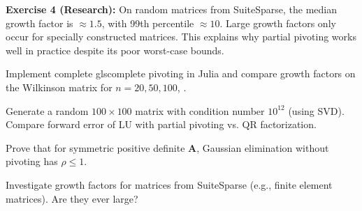 \begin{solution}
\textbf{Exercise 4 (Research):} On random matrices from SuiteSparse, the median growth factor is $\approx 1.5$, with 99th percentile $\approx 10$. Large growth factors only occur for specially constructed matrices. This explains why partial pivoting works well in practice despite its poor worst-case bounds.
\end{solution}

\label{sec:ge:exercises}

\begin{exercise}
Implement complete gls{complete pivoting} in Julia and compare growth factors on the Wilkinson matrix for $n=20, 50, 100$, \cite{urschel2025numerical}.
\end{exercise}

\begin{exercise}
Generate a random $100 \times 100$ matrix with condition number $10^{12}$ (using SVD). Compare forward error of LU with partial pivoting vs. QR factorization.
\end{exercise}

\begin{exercise}
Prove that for symmetric positive definite $\bm{A}$, Gaussian elimination without pivoting has $\rho \le 1$.
\end{exercise}

\begin{exercise}[Research] Investigate growth factors for matrices from SuiteSparse (e.g., finite element matrices). Are they ever large?
\end{exercise}